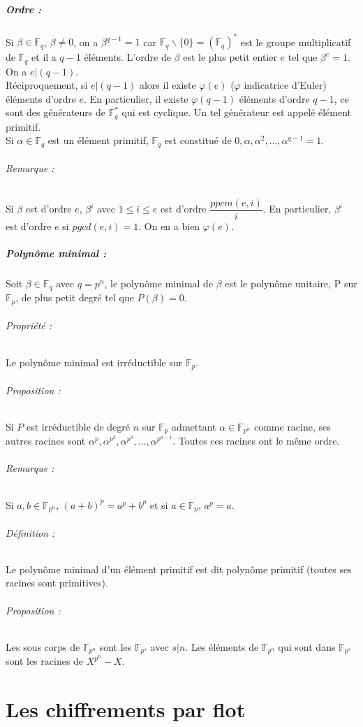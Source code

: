 \documentclass[12pt,a4paper]{report}
\begin{document}
\paragraph{Ordre :\\}
Si $\beta \in \mathbb{F}_q$, $ \beta \neq 0$, on a $\beta^{q-1} = 1$ car $\mathbb{F}_q\backslash \{0\} = (\mathbb{F}_q)^*$ est le groupe multiplicatif de $\mathbb{F}_q$ et il a $q-1$ éléments. L'ordre de $\beta$ est le plus petit entier $e$ tel que $\beta ^e = 1$. On a $e | (q-1)$.\\
Réciproquement, si $e |(q-1)$ alors il existe $\varphi(e)$ ($\varphi$ indicatrice d'Euler) éléments d'ordre $e$. En particulier, il existe $\varphi(q-1)$ éléments d'ordre $q-1$, ce sont des générateurs de $\mathbb{F}_q^*$ qui est cyclique. Un tel générateur est appelé élément primitif.\\
Si $\alpha \in \mathbb{F}_q$ est un élément primitif, $\mathbb{F}_q$ est constitué de $0,\alpha, \alpha^2, \ldots, \alpha^{q-1} = 1$.
\subparagraph{Remarque :\\}
Si $\beta$ est d'ordre $e$, $\beta^i$ avec $1\leqslant i \leqslant e$ est d'ordre $\dfrac{ppcm(e,i)}{i}$. En particulier, $\beta^i$ est d'ordre $e$ si $pgcd(e,i)=1$. On en a bien $\varphi(e)$.
\paragraph{Polynôme minimal : \\}
Soit $\beta \in \mathbb{F}_q$ avec $q=p^n$, le polynôme minimal de $\beta$ est le polynôme unitaire, P sur $\mathbb{F}_p$, de plus petit degré tel que $P(\beta) = 0$.
\subparagraph{Propriété :} Le polynôme minimal est irréductible sur $\mathbb{F}_p$.
\subparagraph{Proposition :} Si $P$ est irréductible de degré $n$ sur $\mathbb{F}_p$ admettant $\alpha \in \mathbb{F}_{p^n}$ comme racine, ses autres racines sont $\alpha^p, \alpha^{p^2}, \alpha^{p^3}, \ldots, \alpha^{p^{n-1}}$. Toutes ces racines ont le même ordre.
\subparagraph{Remarque :} Si $a,b \in \mathbb{F}_{p^n}$, $(a+b)^p = a^p + b^p$ et si $a \in \mathbb{F}_p$, $a^p=a$.
\subparagraph{Définition :} Le polynôme minimal d'un élément primitif est dit polynôme primitif (toutes ses racines sont primitives).
\subparagraph{Proposition :} Les sous corps de $\mathbb{F}_{p^n}$ sont les $\mathbb{F}_{p^s}$ avec $s|n$. Les éléments de $\mathbb{F}_{p^n}$ qui sont dans $\mathbb{F}_{p^s}$ sont les racines de $X^{p^n}-X$.

\chapter{Les chiffrements par flot}
\end{document}
